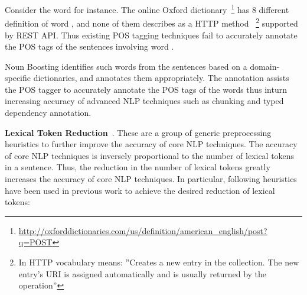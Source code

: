 Consider the word  for instance. 
The online Oxford dictionary~\footnote{\url{http://oxforddictionaries.com/us/definition/american_english/post?q=POST}} has 8 different definition of word , and none of them describes  as a HTTP method
~\footnote{In HTTP vocabulary  means: ''Creates a new entry in the collection.
The new entry's URI is assigned automatically and is usually returned by the operation''}
supported by REST API.
Thus existing POS tagging techniques fail to accurately annotate the POS tags of the sentences involving word .  

Noun Boosting identifies such words from the sentences based on a domain-specific dictionaries, and annotates them appropriately.
The annotation assists the POS tagger to accurately annotate the POS tags of the words thus inturn increasing accuracy of advanced NLP techniques such as chunking and typed dependency annotation.

\textbf{Lexical Token Reduction}~\cite{pandita13:WHYPER}.
These are a group of generic preprocessing heuristics to further improve the accuracy of core NLP techniques.
The accuracy of core NLP techniques is inversely proportional to the number of lexical tokens in a sentence.
Thus, the reduction in the number of lexical tokens greatly increases the accuracy of core NLP techniques. 
In particular, following heuristics have been used in previous work to achieve the desired reduction of lexical tokens:


